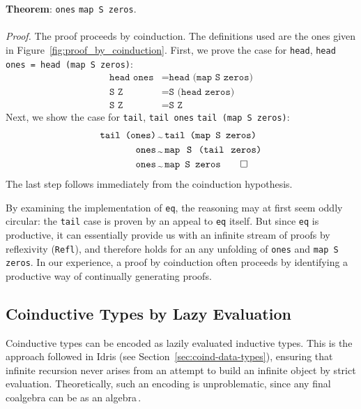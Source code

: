 \begin{framed}
\textbf{Theorem}: \texttt{ones} \bisim{} \texttt{map S zeros}. \\\\
\emph{Proof.} The proof proceeds by coinduction. The definitions used are the
ones given in Figure~\ref{fig:proof_by_coinduction}. First, we prove the case
for \texttt{head}, \texttt{head ones = head~(map~S~zeros)}:
\begin{align*}
   \texttt{head ones} &= \texttt{head (map S zeros)} \\
   \texttt{S Z} &= \texttt{S (head zeros)} \\
   \texttt{S Z} &= \texttt{S Z}
\end{align*}
Next, we show the case for \texttt{tail}, \texttt{tail ones} \bisim{} \texttt{tail
  (map S zeros)}:
\begin{align*}
   \texttt{tail (ones)}\, &\bisim\, \texttt{tail (map S zeros)} \\
   \texttt{ones}\,&\bisim\, \texttt{map\, S\, (tail\, zeros)} \\
   \texttt{ones} \,&\bisim\, \texttt{map S zeros} \qed
\end{align*}
The last step follows immediately from the coinduction hypothesis.
\end{framed}



By examining the implementation of \texttt{eq}, the reasoning may at first seem
oddly circular: the \texttt{tail} case is proven by an appeal to \texttt{eq}
itself. But since \texttt{eq} is productive, it can essentially provide us with
an infinite stream of proofs by reflexivity (\texttt{Refl}), and therefore holds
for an any unfolding of \texttt{ones} and \texttt{map S zeros}. In
our experience, a proof by coinduction often proceeds by identifying a productive
way of continually generating proofs.

\subsection{Coinductive Types by Lazy Evaluation}
Coinductive types can be encoded as lazily evaluated inductive types. This is
the approach followed in Idris (see Section~\ref{sec:coind-data-types}),
ensuring that infinite recursion never arises from an attempt to build an
infinite object by strict evaluation. Theoretically, such an encoding is
unproblematic, since any final coalgebra can be as an
algebra\,\citep{JacobsCoalgebra}.


